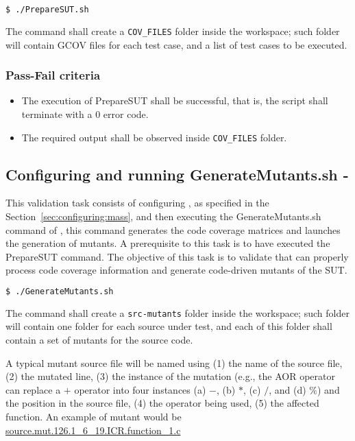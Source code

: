 \begin{lstlisting}[language=bash]
  $ ./PrepareSUT.sh
\end{lstlisting}

The command shall create a \texttt{COV\_FILES} folder inside the \MASS workspace; such folder will contain GCOV files for each test case, and a list of test cases to be executed.

\subsubsection{Pass-Fail criteria}

\begin{itemize}
  \item The execution of PrepareSUT shall be successful, that is, the script shall terminate with a 0 error code.
  \item The required output shall be observed inside \texttt{COV\_FILES} folder.
\end{itemize}

\subsection{Configuring \MASS and running GenerateMutants.sh - \MASS}

This validation task consists of configuring \MASS, as specified in the Section~\ref{sec:configuring:mass}, and then executing the GenerateMutants.sh command of \MASS, this command generates the code coverage matrices and launches the generation of mutants. A prerequisite to this task is to have executed the PrepareSUT command.
The objective of this task is to validate that \MASS can properly process code coverage information and generate code-driven mutants of the SUT.

\begin{lstlisting}[language=bash]
  $ ./GenerateMutants.sh
\end{lstlisting}

The command shall create a \texttt{src-mutants} folder inside the \MASS workspace; such folder will contain one folder for each source under test, and each of this folder shall contain a set of mutants for the source code.

A typical mutant source file will be named using (1) the name of the source file, (2) the mutated line, (3) the instance of the mutation (e.g., the AOR operator can replace a $+$ operator into four instances (a) $-$, (b) $*$, (c) $/$, and (d) $\%$) and the position in the source file, (4) the operator being used, (5) the affected function. An example of mutant would be \url{source.mut.126.1_6_19.ICR.function_1.c}

